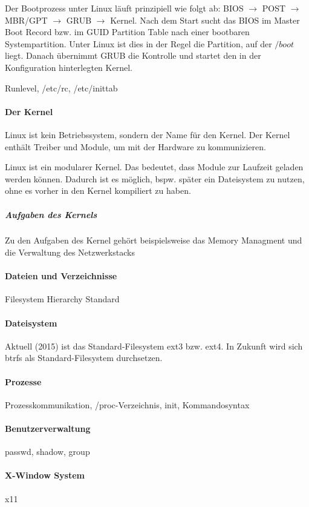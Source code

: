 Der Bootprozess unter Linux läuft prinzipiell wie folgt ab: BIOS $\to$ POST $\to$ MBR/GPT $\to$ GRUB $\to$ Kernel. Nach dem Start sucht das BIOS im Master Boot Record bzw. im GUID Partition Table nach einer bootbaren Systempartition. Unter Linux ist dies in der Regel die Partition, auf der $/boot$ liegt. Danach übernimmt GRUB die Kontrolle und startet den in der Konfiguration hinterlegten Kernel.

Runlevel, /etc/rc, /etc/inittab

\paragraph{Der Kernel}

Linux ist kein Betriebssystem, sondern der Name für den Kernel. Der Kernel enthält Treiber und Module, um mit der Hardware zu kommunizieren.

Linux ist ein modularer Kernel. Das bedeutet, dass Module zur Laufzeit geladen werden können. Dadurch ist es möglich, bspw. später ein Dateisystem zu nutzen, ohne es vorher in den Kernel kompiliert zu haben.

\subparagraph{Aufgaben des Kernels}

Zu den Aufgaben des Kernel gehört beispielsweise das Memory Managment und die Verwaltung des Netzwerkstacks

\paragraph{Dateien und Verzeichnisse}
Filesystem Hierarchy Standard

\paragraph{Dateisystem}
Aktuell (2015) ist das Standard-Filesystem ext3 bzw. ext4. In Zukunft wird sich btrfs als Standard-Filesystem durchsetzen.

\paragraph{Prozesse}
Prozesskommunikation, /proc-Verzeichnis, init, Kommandosyntax

\paragraph{Benutzerverwaltung}
passwd, shadow, group

\paragraph{X-Window System}
x11

